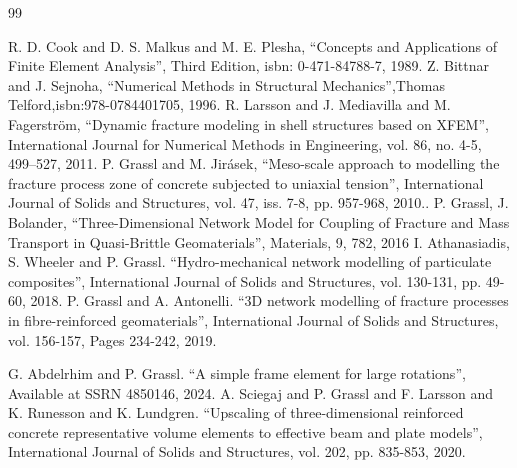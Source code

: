 \documentclass[a4paper]{article}
\begin{document}

\begin{thebibliography}{99}


 R. D. Cook and D. S. Malkus and M. E. Plesha, ``Concepts and Applications of Finite Element Analysis'', Third Edition, isbn: 0-471-84788-7, 1989.
 Z. Bittnar and J. Sejnoha, ``Numerical Methods in Structural Mechanics'',Thomas Telford,isbn:978-0784401705, 1996.
 R. Larsson and J. Mediavilla and M. Fagerström, ``Dynamic fracture modeling in shell structures based on XFEM'', International Journal for Numerical Methods in Engineering, vol. 86, no. 4-5, 499--527, 2011.
 P. Grassl and M. Jir\'{a}sek, ``Meso-scale approach to modelling the fracture process zone of concrete subjected to uniaxial tension'', International Journal of Solids and Structures, vol. 47, iss. 7-8, pp. 957-968, 2010..
 P. Grassl, J. Bolander, ``Three-Dimensional Network Model for Coupling of Fracture and Mass Transport in Quasi-Brittle Geomaterials'', Materials, 9, 782, 2016
 I. Athanasiadis, S. Wheeler and P. Grassl. ``Hydro-mechanical network modelling of particulate composites'', International Journal of Solids and Structures, vol. 130-131, pp. 49-60, 2018.
 P. Grassl and A. Antonelli. ``3D network modelling of fracture processes in fibre-reinforced geomaterials'', International Journal of Solids and Structures, vol. 156-157, Pages 234-242, 2019.

  
 G. Abdelrhim and P. Grassl. ``A simple frame element for large rotations'', Available at SSRN 4850146, 2024.
 A. Sciegaj and P. Grassl and F. Larsson and K. Runesson and K. Lundgren. ``Upscaling of three-dimensional reinforced concrete representative volume elements to effective beam and plate models'', International Journal of Solids and Structures, vol. 202, pp. 835-853, 2020.
\end{thebibliography}
\end{document}

